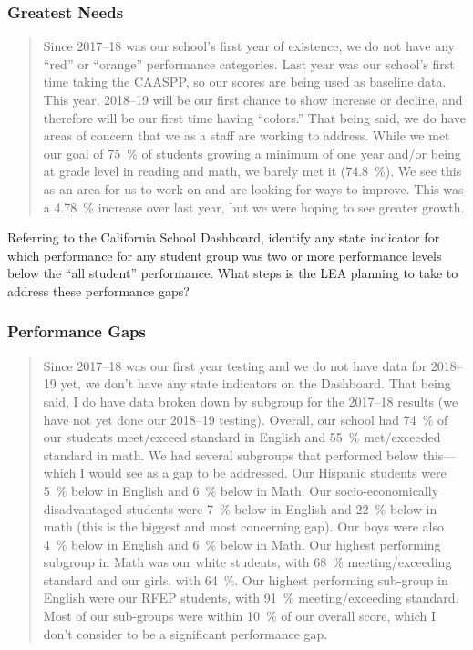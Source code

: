 \documentclass{article}
\newcounter{goal}[section] %
\begin{document}
\subsubsection{Greatest Needs}
\begin{quotation}
	Since 2017--18 was our school's first year of existence, we do not have any ``red'' or ``orange'' performance categories. Last year was our school's first time taking the CAASPP, so our scores are being used as baseline data. This year, 2018--19 will be our first chance to show increase or decline, and therefore will be our first time having ``colors.'' That being said, we do have areas of concern that we as a staff are working to address. While we met our goal of \SI{75}{\percent} of students growing a minimum of one year and/or being at grade level in reading and math, we barely met it (\SI{74.8}{\percent}). We see this as an area for us to work on and are looking for ways to improve. This was a \SI{4.78}{\percent} increase over last year, but we were hoping to see greater growth.
\end{quotation}

Referring to the California School Dashboard, identify any state indicator for which performance for any student group was two or more performance levels below the ``all student'' performance. What steps is the LEA planning to take to address these performance gaps?
\subsubsection{Performance Gaps}
\begin{quotation}
	Since 2017--18 was our first year testing and we do not have data for 2018--19 yet, we don't have any state indicators on the Dashboard. That being said, I do have data broken down by subgroup for the 2017--18 results (we have not yet done our 2018--19 testing). Overall, our school had \SI{74}{\percent} of our students meet/exceed standard in English and \SI{55}{\percent} met/exceeded standard in math. We had several subgroups that performed below this---which I would see as a gap to be addressed. Our Hispanic students were \SI{5}{\percent} below in English and \SI{6}{\percent} below in Math. Our socio-economically disadvantaged students were \SI{7}{\percent} below in English and \SI{22}{\percent} below in math (this is the biggest and most concerning gap). Our boys were also \SI{4}{\percent} below in English and \SI{6}{\percent} below in Math. Our highest performing subgroup in Math was our white students, with \SI{68}{\percent} meeting/exceeding standard and our girls, with \SI{64}{\percent}. Our highest performing sub-group in English were our RFEP students, with \SI{91}{\percent} meeting/exceeding standard. Most of our sub-groups were within \SI{10}{\percent} of our overall score, which I don't consider to be a significant performance gap.
\end{quotation}
\end{document}
